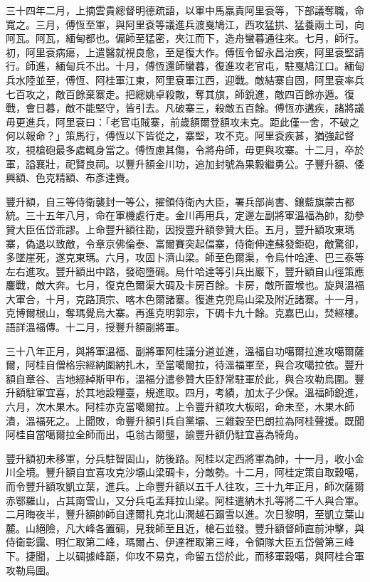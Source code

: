 \begin{pinyinscope}
三十四年二月，上摘雲貴總督明德疏語，以軍中馬羸責阿里袞等，下部議奪職，命寬之。三月，傅恆至軍，與阿里袞等議進兵渡戛鳩江，西攻猛拱、猛養兩土司，向阿瓦。阿瓦，緬甸都也。偏師至猛密，夾江而下，造舟蠻暮通往來。七月，師行。初，阿里袞病瘍，上遣醫就視良愈，至是復大作。傅恆令留永昌治疾，阿里袞堅請行。師進，緬甸兵不出。十月，傅恆還師蠻暮，復進攻老官屯，駐戛鳩江口。緬甸兵水陸並至，傅恆、阿桂軍江東，阿里袞軍江西，迎戰。敵結寨自固，阿里袞率兵七百攻之，敵百餘棄寨走。把總姚卓殺敵，奪其旗，師銳進，敵四百餘亦遁。復戰，會日暮，敵不能堅守，皆引去。凡破寨三，殺敵五百餘。傅恆亦遘疾，諸將議毋更進兵，阿里袞曰：「老官屯賊寨，前歲額爾登額攻未克。距此僅一舍，不破之何以報命？」策馬行，傅恆以下皆從之，寨堅，攻不克。阿里袞疾甚，猶強起督攻，視槍砲最多處輒身當之。傅恆慮其傷，令將舟師，毋更與攻寨。十二月，卒於軍，謚襄壯，祀賢良祠。以豐升額金川功，追加封號為果毅繼勇公。子豐升額、倭興額、色克精額、布彥達賚。

豐升額，自三等侍衛襲封一等公，擢領侍衛內大臣，署兵部尚書、鑲藍旗蒙古都統。三十五年八月，命在軍機處行走。金川再用兵，定邊左副將軍溫福為帥，劾參贊大臣伍岱乖謬。上命豐升額往勘，因授豐升額參贊大臣。五月，豐升額攻東瑪寨，偽退以致敵，令章京佛倫泰、富爾賽突起偪寨，侍衛伸達蘇發鉅砲，敵驚卻，多墜崖死，遂克東瑪。六月，攻固卜濟山梁。師至色爾渠，令烏什哈達、巴三泰等左右進攻。豐升額出中路，發砲墮碉。烏什哈達等引兵出巖下，豐升額自山徑策應鏖戰，敵大奔。七月，復克色爾渠大碉及卡房百餘。卡房，敵所置堠也。旋與溫福大軍合，十月，克路頂宗、喀木色爾諸寨。復進克兜烏山梁及附近諸寨。十一月，克博爾根山，奪瑪覺烏大寨。再進克明郭宗，下碉卡九十餘。克嘉巴山，焚經樓。語詳溫福傳。十二月，授豐升額副將軍。

三十八年正月，與將軍溫福、副將軍阿桂議分道並進，溫福自功噶爾拉進攻噶爾薩爾，阿桂自僧格宗經納圍納扎木，至當噶爾拉，待溫福軍至，與合攻噶拉依。豐升額自章谷、吉地經綽斯甲布，溫福分遣參贊大臣舒常駐軍於此，與合攻勒烏圍。豐升額駐軍宜喜，於其地設糧臺，規進取。四月，考績，加太子少保。溫福師銳進，六月，次木果木。阿桂亦克當噶爾拉。上令豐升額攻大板昭，命未至，木果木師潰，溫福死之。上聞敗，命豐升額引兵自黨壩、三雜穀至巴朗拉為阿桂聲援。既聞阿桂自當噶爾拉全師而出，屯翁古爾壟，諭豐升額仍駐宜喜為犄角。

豐升額初未移軍，分兵駐智固山，防後路。阿桂以定西將軍為帥，十一月，收小金川全境。豐升額自宜喜攻克沙壩山梁碉卡，分敵勢。十二月，阿桂定策自取穀噶，而令豐升額攻凱立葉，進兵。上命豐升額以五千人往攻，三十九年正月，師次薩爾赤鄂羅山，占其南雪山，又分兵屯孟拜拉山梁。阿桂遣納木扎等將二千人與合軍。二月晦夜半，豐升額帥師自達爾扎克北山澖越石蹋雪以進。次日黎明，至凱立葉山麓。山絕險，凡大峰各置碉，見我師至且近，槍石並發。豐升額督師直前沖擊，與侍衛彰靄、明仁取第二峰，瑪爾占、伊達裡取第三峰，令領隊大臣五岱營第三峰下。捷聞，上以碉據峰巔，仰攻不易克，命留五岱於此，而移軍穀噶，與阿桂合軍攻勒烏圍。


\end{pinyinscope}
